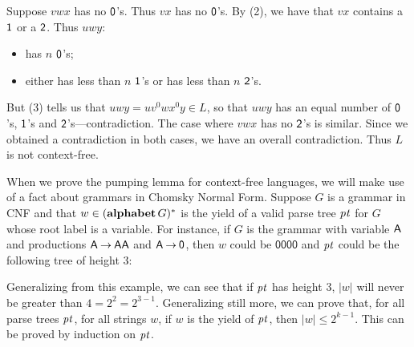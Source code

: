 Suppose $vwx$ has no $\mathsf{0}$'s.  Thus $vx$ has no $\mathsf{0}$'s.
By (2), we have that $vx$ contains a $\mathsf{1}$ or a $\mathsf{2}$.
Thus $uwy$:
\begin{itemize}
\item has $n$ $\mathsf{0}$'s;

\item either has less than $n$ $\mathsf{1}$'s or has less
than $n$ $\mathsf{2}$'s.
\end{itemize}
But (3) tells us that $uwy=uv^0wx^0y\in L$, so that $uwy$ has an equal
number of $\mathsf{0}$'s, $\mathsf{1}$'s and $\mathsf{2}$'s---contradiction.
The case where $vwx$ has no $\mathsf{2}$'s is similar.
Since we obtained a contradiction in both cases, we have an overall
contradiction.  Thus $L$ is not context-free.

When we prove the pumping lemma for context-free languages, we will
make use of a fact about grammars in Chomsky Normal Form.
Suppose $G$ is a grammar in CNF and that $w\in(\mathbf{alphabet}\,G)^*$
is the yield of a valid parse tree ${\it pt}$ for $G$ whose root label
is a variable.
For instance, if $G$ is the grammar with variable $\mathsf{A}$ and
productions $\mathsf{A}\mathbin{\to}\mathsf{A}\mathsf{A}$ and $\mathsf{A}\mathbin{\to}\mathsf{0}$, then
$w$ could be $\mathsf{0000}$ and ${\it pt}$ could be the following
tree of height $3$:
\begin{center}

\end{center}

Generalizing from this example, we can see that if ${\it pt}$ has height
$3$, $|w|$ will never be greater than $4=2^2=2^{3-1}$.  Generalizing
still more, we can prove that, for all parse trees ${\it pt}$, for all
strings $w$, if $w$ is the yield of ${\it pt}$, then $|w|\leq { 2^{k-1}}$.
This can be proved by induction on ${\it pt}$.


